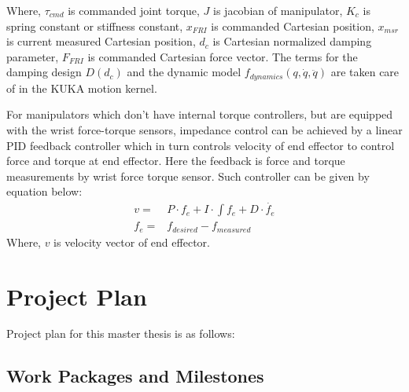 \documentclass[thesis]{mas_proposal}
\begin{document}
Where,
$\tau_{cmd}$ is commanded joint torque, $J$ is jacobian of manipulator, $K_{c}$ is spring constant or stiffness constant, $x_{FRI}$ is commanded Cartesian position, $x_{msr}$ is current measured Cartesian position, $d_{c}$ is Cartesian normalized damping parameter, $F_{FRI}$ is commanded Cartesian force vector. The terms for the damping design $D(d_{c})$ and the dynamic model $f_{dynamics}(q, \dot{q}, \ddot{q})$ are taken care of in the KUKA motion
kernel.   

For manipulators which don't have internal torque controllers, but are equipped with the wrist force-torque sensors, impedance control can be achieved by a linear PID feedback controller which in turn controls velocity of end effector to control force and torque at end effector. Here the feedback is force and torque measurements by wrist force torque sensor. Such controller can be given by equation below:
\begin{align}
	v =& P \cdot f_{e} + I \cdot \int f_{e} + D \cdot \dot{f_{e}} \\
	f_{e} =& f_{desired} - f_{measured}
\end{align}   
Where, $v$ is velocity vector of end effector.
\chapter{Project Plan}
Project plan for this master thesis is as follows:
\section{Work Packages and Milestones}
\end{document}
